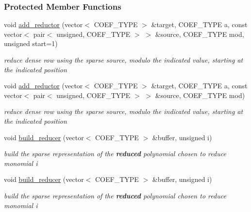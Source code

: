 \subsubsection*{Protected Member Functions}
\begin{DoxyCompactItemize}
\item 
void \hyperlink{group___g_b_computation_af10c8ec51df3bcf3b2be5bbeb4126cd1}{add\+\_\+reductor} (vector$<$ C\+O\+E\+F\+\_\+\+T\+Y\+PE $>$ \&target, C\+O\+E\+F\+\_\+\+T\+Y\+PE a, const vector$<$ pair$<$ unsigned, C\+O\+E\+F\+\_\+\+T\+Y\+PE $>$ $>$ \&source, C\+O\+E\+F\+\_\+\+T\+Y\+PE mod, unsigned start=1)
\begin{DoxyCompactList}\small\item\em reduce dense row using the sparse source, modulo the indicated value, starting at the indicated position \end{DoxyCompactList}\item 
void \hyperlink{group___g_b_computation_a766380b6700443ecfa99aa03ff7df274}{add\+\_\+reductor} (vector$<$ C\+O\+E\+F\+\_\+\+T\+Y\+PE $>$ \&target, C\+O\+E\+F\+\_\+\+T\+Y\+PE a, const vector$<$ pair$<$ unsigned, C\+O\+E\+F\+\_\+\+T\+Y\+PE $>$ $>$ \&source, C\+O\+E\+F\+\_\+\+T\+Y\+PE mod)
\begin{DoxyCompactList}\small\item\em reduce dense row using the sparse source, modulo the indicated value, starting at the indicated position \end{DoxyCompactList}\item 
void \hyperlink{group___g_b_computation_aadda8de768e8a8c504979be7425f85ac}{build\+\_\+reducer} (vector$<$ C\+O\+E\+F\+\_\+\+T\+Y\+PE $>$ \&buffer, unsigned i)
\begin{DoxyCompactList}\small\item\em build the sparse representation of the {\bfseries reduced} polynomial chosen to reduce monomial {\ttfamily i} \end{DoxyCompactList}\item 
void \hyperlink{group___g_b_computation_aadda8de768e8a8c504979be7425f85ac}{build\+\_\+reducer} (vector$<$ C\+O\+E\+F\+\_\+\+T\+Y\+PE $>$ \&buffer, unsigned i)
\begin{DoxyCompactList}\small\item\em build the sparse representation of the {\bfseries reduced} polynomial chosen to reduce monomial {\ttfamily i} \end{DoxyCompactList}\item 
\mbox{\label{group___g_b_computation_a385d863722c1e2f9e9769ba27b5cb374}} 

\end{DoxyCompactItemize}
